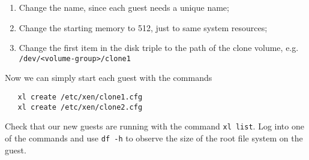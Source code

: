 \documentclass{article}
\begin{document}
\begin{enumerate}
  \item Change the name, since each guest needs a unique name;
  \item Change the starting memory to 512, just to same system resources;
  \item Change the first item in the disk triple to the path of the clone volume, e.g. \texttt{/dev/<volume-group>/clone1}
 \end{enumerate}
 
 Now we can simply start each guest with the commands
 
 \begin{verbatim}
   xl create /etc/xen/clone1.cfg
   xl create /etc/xen/clone2.cfg
 \end{verbatim}
 
 Check that our new guests are running with the command \texttt{xl list}. Log into one of the commands and use \texttt{df -h} to observe the size of the root file system on the guest. 
 
 
\end{document}

